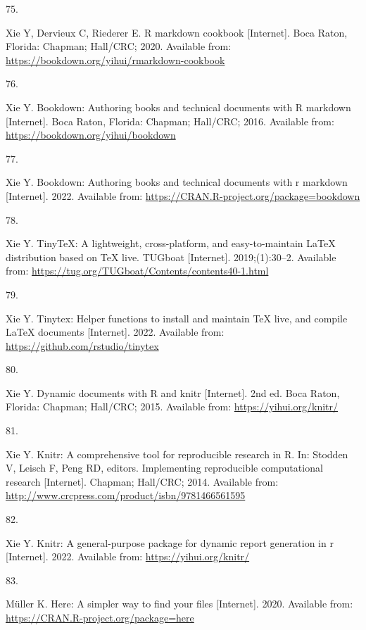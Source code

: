 \documentclass[10pt,a4paper]{article}
\newlength{\cslhangindent}
\newlength{\csllabelwidth}
\newenvironment{CSLReferences}[2] %
{\begin{list}{}{%
	\setlength{\itemindent}{0pt}
	\setlength{\leftmargin}{0pt}
	\setlength{\parsep}{0pt}
	\ifodd #1
	\setlength{\leftmargin}{\cslhangindent}
	\setlength{\itemindent}{-1\cslhangindent}
	\fi
	\setlength{\itemsep}{#2\baselineskip}}}
{\end{list}}
\newcommand{\CSLLeftMargin}[1]{\parbox[t]{\csllabelwidth}{\strut#1\strut}}
\newcommand{\CSLRightInline}[1]{\parbox[t]{\linewidth - \csllabelwidth}{\strut#1\strut}}
\begin{document}
\begin{CSLReferences}{0}{1}
\CSLLeftMargin{75. }%
\CSLRightInline{Xie Y, Dervieux C, Riederer E. R markdown cookbook {[}Internet{]}. Boca Raton, Florida: Chapman; Hall/CRC; 2020. Available from: \url{https://bookdown.org/yihui/rmarkdown-cookbook}}

\CSLLeftMargin{76. }%
\CSLRightInline{Xie Y. Bookdown: Authoring books and technical documents with {R} markdown {[}Internet{]}. Boca Raton, Florida: Chapman; Hall/CRC; 2016. Available from: \url{https://bookdown.org/yihui/bookdown}}

\CSLLeftMargin{77. }%
\CSLRightInline{Xie Y. Bookdown: Authoring books and technical documents with r markdown {[}Internet{]}. 2022. Available from: \url{https://CRAN.R-project.org/package=bookdown}}

\CSLLeftMargin{78. }%
\CSLRightInline{Xie Y. TinyTeX: A lightweight, cross-platform, and easy-to-maintain LaTeX distribution based on TeX live. TUGboat {[}Internet{]}. 2019;(1):30--2. Available from: \url{https://tug.org/TUGboat/Contents/contents40-1.html}}

\CSLLeftMargin{79. }%
\CSLRightInline{Xie Y. Tinytex: Helper functions to install and maintain TeX live, and compile LaTeX documents {[}Internet{]}. 2022. Available from: \url{https://github.com/rstudio/tinytex}}

\CSLLeftMargin{80. }%
\CSLRightInline{Xie Y. Dynamic documents with {R} and knitr {[}Internet{]}. 2nd ed. Boca Raton, Florida: Chapman; Hall/CRC; 2015. Available from: \url{https://yihui.org/knitr/}}

\CSLLeftMargin{81. }%
\CSLRightInline{Xie Y. Knitr: A comprehensive tool for reproducible research in {R}. In: Stodden V, Leisch F, Peng RD, editors. Implementing reproducible computational research {[}Internet{]}. Chapman; Hall/CRC; 2014. Available from: \url{http://www.crcpress.com/product/isbn/9781466561595}}

\CSLLeftMargin{82. }%
\CSLRightInline{Xie Y. Knitr: A general-purpose package for dynamic report generation in r {[}Internet{]}. 2022. Available from: \url{https://yihui.org/knitr/}}

\CSLLeftMargin{83. }%
\CSLRightInline{Müller K. Here: A simpler way to find your files {[}Internet{]}. 2020. Available from: \url{https://CRAN.R-project.org/package=here}}


\end{CSLReferences}
\end{document}
